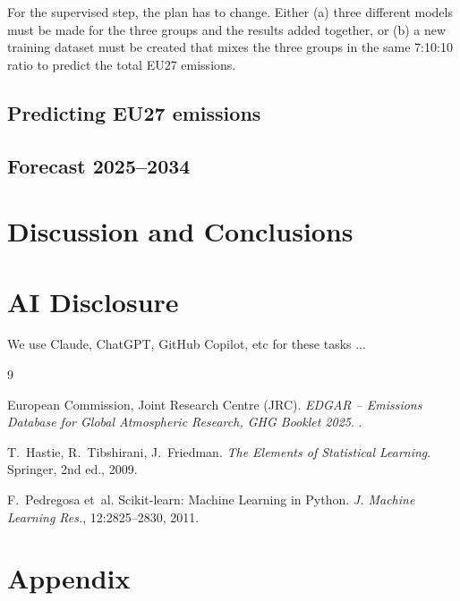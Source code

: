 \documentclass[11pt,a4paper]{article}
\begin{document}
For the supervised step, the plan has to change. Either (a) three different models must be made for the three groups and the results added together, or (b) a new training dataset must be created that mixes the three groups in the same 7:10:10 ratio to predict the total EU27 emissions.

\subsection{Predicting EU27 emissions}\label{sec:regression}

\subsection{Forecast 2025--2034}\label{sec:forecast}

\section{Discussion and Conclusions}\label{sec:conclusion}

\section*{AI Disclosure}
We use Claude, ChatGPT, GitHub Copilot, etc for these tasks ...


\begin{thebibliography}{9}

European Commission, Joint Research Centre (JRC).
\newblock \emph{EDGAR -- Emissions Database for Global Atmospheric Research, GHG Booklet 2025}.
.

T.~Hastie, R.~Tibshirani, J.~Friedman.
\newblock \emph{The Elements of Statistical Learning}.
\newblock Springer, 2nd ed., 2009.

F.~Pedregosa et~al.
\newblock Scikit-learn: Machine Learning in Python.
\newblock \emph{J. Machine Learning Res.}, 12:2825--2830, 2011.

\end{thebibliography}

\appendix
\section{Appendix}\label{sec:appendix}
\end{document}
